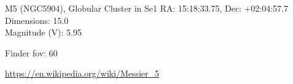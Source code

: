 \begin{block}{M5 (NGC5904), Globular Cluster in Se1}
    RA: 15:18:33.75, Dec: +02:04:57.7 \\ 
    Dimensions: 15.0 \\ 
    Magnitude (V): 5.95



    Finder fov: 60 

    \url{https://en.wikipedia.org/wiki/Messier_5} 
\end{block}